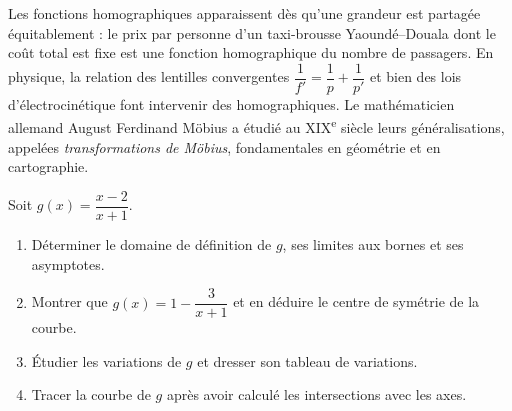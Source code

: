 \documentclass[11pt]{article}
\begin{document}
\begin{savaistu}
Les fonctions homographiques apparaissent dès qu'une grandeur est partagée équitablement : le prix par personne d'un taxi-brousse Yaoundé--Douala dont le coût total est fixe est une fonction homographique du nombre de passagers. En physique, la relation des lentilles convergentes $\dfrac{1}{f'} = \dfrac{1}{p} + \dfrac{1}{p'}$ et bien des lois d'électrocinétique font intervenir des homographiques. Le mathématicien allemand August Ferdinand Möbius a étudié au XIX\textsuperscript{e} siècle leurs généralisations, appelées \emph{transformations de Möbius}, fondamentales en géométrie et en cartographie.
\end{savaistu}

\begin{exercice}
Soit $g(x) = \dfrac{x - 2}{x + 1}$.
\begin{enumerate}
\item Déterminer le domaine de définition de $g$, ses limites aux bornes et ses asymptotes.
\item Montrer que $g(x) = 1 - \dfrac{3}{x+1}$ et en déduire le centre de symétrie de la courbe.
\item Étudier les variations de $g$ et dresser son tableau de variations.
\item Tracer la courbe de $g$ après avoir calculé les intersections avec les axes.
\end{enumerate}
\end{exercice}
\end{document}
